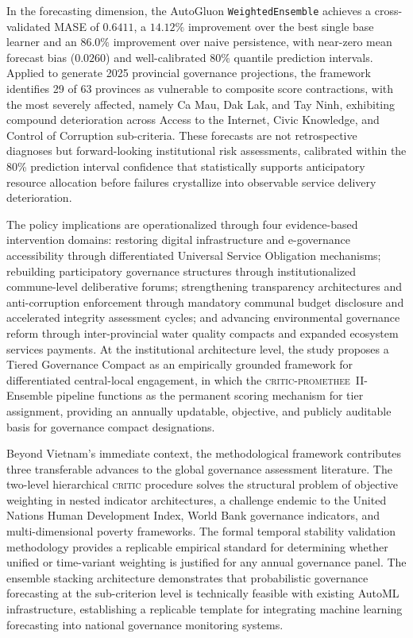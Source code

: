 \documentclass[12pt,a4paper]{article}
\newcommand{\CRITIC}{\textsc{critic}\xspace}
\newcommand{\PROMETHEE}{\textsc{promethee}\xspace}
\begin{document}
In the forecasting dimension, the AutoGluon \texttt{WeightedEnsemble} achieves a cross-validated MASE of $0.6411$, a $14.12\%$ improvement over the best single base learner and an $86.0\%$ improvement over naive persistence, with near-zero mean forecast bias ($0.0260$) and well-calibrated $80\%$ quantile prediction intervals. Applied to generate 2025 provincial governance projections, the framework identifies 29 of 63 provinces as vulnerable to composite score contractions, with the most severely affected, namely Ca Mau, Dak Lak, and Tay Ninh, exhibiting compound deterioration across Access to the Internet, Civic Knowledge, and Control of Corruption sub-criteria. These forecasts are not retrospective diagnoses but forward-looking institutional risk assessments, calibrated within the 80\% prediction interval confidence that statistically supports anticipatory resource allocation before failures crystallize into observable service delivery deterioration.

The policy implications are operationalized through four evidence-based intervention domains: restoring digital infrastructure and e-governance accessibility through differentiated Universal Service Obligation mechanisms; rebuilding participatory governance structures through institutionalized commune-level deliberative forums; strengthening transparency architectures and anti-corruption enforcement through mandatory communal budget disclosure and accelerated integrity assessment cycles; and advancing environmental governance reform through inter-provincial water quality compacts and expanded ecosystem services payments. At the institutional architecture level, the study proposes a Tiered Governance Compact as an empirically grounded framework for differentiated central-local engagement, in which the \CRITIC-\PROMETHEE~II-Ensemble pipeline functions as the permanent scoring mechanism for tier assignment, providing an annually updatable, objective, and publicly auditable basis for governance compact designations.

Beyond Vietnam's immediate context, the methodological framework contributes three transferable advances to the global governance assessment literature. The two-level hierarchical \CRITIC procedure solves the structural problem of objective weighting in nested indicator architectures, a challenge endemic to the United Nations Human Development Index, World Bank governance indicators, and multi-dimensional poverty frameworks. The formal temporal stability validation methodology provides a replicable empirical standard for determining whether unified or time-variant weighting is justified for any annual governance panel. The ensemble stacking architecture demonstrates that probabilistic governance forecasting at the sub-criterion level is technically feasible with existing AutoML infrastructure, establishing a replicable template for integrating machine learning forecasting into national governance monitoring systems.
\end{document}
